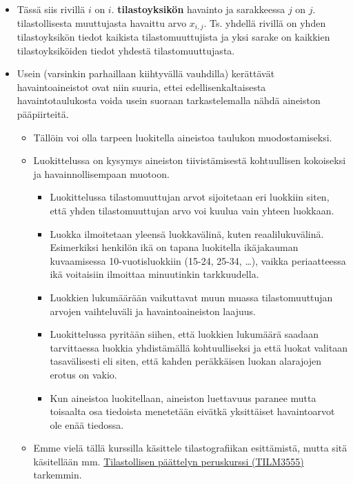 \documentclass[
]{book}
\providecommand{\tightlist}{%
  \setlength{\itemsep}{0pt}\setlength{\parskip}{0pt}}
\begin{document}
\begin{itemize}
\item
  Tässä siis rivillä \(i\) on \(i\). \textbf{tilastoyksikön} havainto ja sarakkeessa \(j\) on \(j\). tilastollisesta muuttujasta havaittu arvo \(x_{i,j}\). Ts. yhdellä rivillä on yhden tilastoyksikön tiedot kaikista tilastomuuttujista ja yksi sarake on kaikkien tilastoyksiköiden tiedot yhdestä tilastomuuttujasta.
\item
  Usein (varsinkin parhaillaan kiihtyvällä vauhdilla) kerättävät havaintoaineistot ovat niin suuria, ettei edellisenkaltaisesta havaintotaulukosta voida usein suoraan tarkastelemalla nähdä aineiston pääpiirteitä.

  \begin{itemize}
  \tightlist
  \item
    Tällöin voi olla tarpeen luokitella aineistoa taulukon muodostamiseksi.\\
  \item
    Luokittelussa on kysymys aineiston tiivistämisestä kohtuullisen kokoiseksi ja havainnollisempaan muotoon.

    \begin{itemize}
    \tightlist
    \item
      Luokittelussa tilastomuuttujan arvot sijoitetaan eri luokkiin siten, että yhden tilastomuuttujan arvo voi kuulua vain yhteen luokkaan.
    \item
      Luokka ilmoitetaan yleensä luokkavälinä, kuten reaalilukuvälinä. Esimerkiksi henkilön ikä on tapana luokitella ikäjakauman kuvaamisessa 10-vuotisluokkiin (15-24, 25-34, \ldots), vaikka periaatteessa ikä voitaisiin ilmoittaa minuutinkin tarkkuudella.\\
    \item
      Luokkien lukumäärään vaikuttavat muun muassa tilastomuuttujan arvojen vaihteluväli ja havaintoaineiston laajuus.
    \item
      Luokittelussa pyritään siihen, että luokkien lukumäärä saadaan tarvittaessa luokkia yhdistämällä kohtuulliseksi ja että luokat valitaan tasavälisesti eli siten, että kahden peräkkäisen luokan alarajojen erotus on vakio.
    \item
      Kun aineistoa luokitellaan, aineiston luettavuus paranee mutta toisaalta osa tiedoista menetetään eivätkä yksittäiset havaintoarvot ole enää tiedossa.\\
    \end{itemize}
  \item
    Emme vielä tällä kurssilla käsittele tilastografiikan esittämistä, mutta sitä käsitellään mm. \href{https://opas.peppi.utu.fi/fi/opintojakso/TILM3555/1731?period=2024-2027}{Tilastollisen päättelyn peruskurssi (TILM3555)} tarkemmin.


\end{itemize}
\end{itemize}
\end{document}
